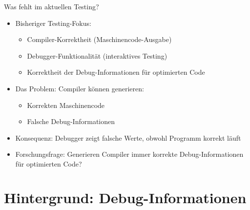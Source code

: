 ﻿\documentclass{beamer}
\newcommand{\dingcheck}{{\color{moderngreen}\ding{52}}}
\newcommand{\dingcross}{{\color{modernred}\ding{54}}}
\begin{document}
\begin{frame}{Was fehlt im aktuellen Testing?}
  \begin{itemize}
    \item Bisheriger Testing-Fokus:
      \begin{itemize}
        \item[\dingcheck] Compiler-Korrektheit (Maschinencode-Ausgabe)
        \item[\dingcheck] Debugger-Funktionalit\"at (interaktives Testing)
        \item[\dingcross] Korrektheit der Debug-Informationen f\"ur optimierten Code
      \end{itemize}
    \item Das Problem: Compiler k\"onnen generieren:
      \begin{itemize}
        \item[\dingcheck] Korrekten Maschinencode
        \item[\dingcross] Falsche Debug-Informationen
      \end{itemize}
    \item Konsequenz: Debugger zeigt falsche Werte, obwohl Programm korrekt l\"auft
    \item Forschungsfrage: Generieren Compiler immer korrekte Debug-Informationen f\"ur optimierten Code?
  \end{itemize}
\end{frame}

\section{Hintergrund: Debug-Informationen}
\end{document}
